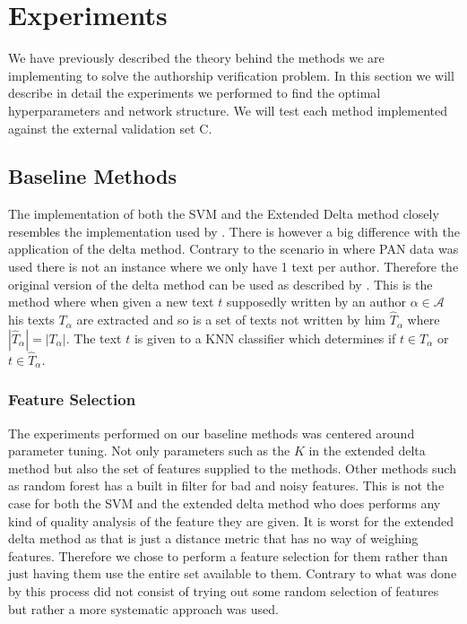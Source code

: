 \section{Experiments} \label{sec:experiments} 

We have previously described the theory behind the methods we are implementing
to solve the authorship verification problem. In this section we will describe
in detail the experiments we performed to find the optimal hyperparameters and
network structure. We will test each method implemented against the external
validation set \gls{C}.

\subsection{Baseline Methods} \label{subsec:baseline_methods}

The implementation of both the \gls{SVM} and the Extended Delta method closely
resembles the implementation used by \citet{US}. There is however a big
difference with the application of the delta method. Contrary to the scenario
in \citep{US} where PAN data was used there is not an instance where we only
have 1 text per author. Therefore the original version of the delta method can
be used as described by \citet{evert2015towards}. This is the method where when
given a new text $t$ supposedly written by an author $\alpha \in \mathcal{A}$
his texts $T_\alpha$ are extracted and so is a set of texts not written by
him $\hat{T}_\alpha$ where $|\hat{T}_\alpha| = |T_\alpha|$. The text $t$ is
given to a \gls{KNN} classifier which determines if $t \in T_\alpha$ or $t \in
\hat{T}_\alpha$.



\subsubsection{Feature Selection}

The experiments performed on our baseline methods was centered around parameter
tuning. Not only parameters such as the $K$ in the extended delta method but
also the set of features supplied to the methods. Other methods such as random
forest has a built in filter for bad and noisy features. This is not the case
for both the \gls{SVM} and the extended delta method who does performs any kind
of quality analysis of the feature they are given. It is worst for the extended
delta method as that is just a distance metric that has no way of weighing
features. Therefore we chose to perform a feature selection for them rather than
just having them use the entire set available to them. Contrary to what was done
by \citet{US} this process did not consist of trying out some random selection
of features but rather a more systematic approach was used.

